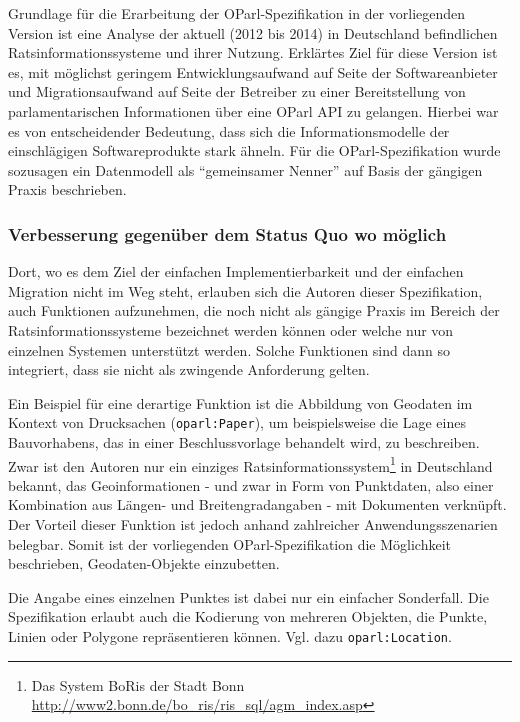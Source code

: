 \documentclass[,a4paper]{article}
\begin{document}
Grundlage für die Erarbeitung der OParl-Spezifikation in der
vorliegenden Version ist eine Analyse der aktuell (2012 bis 2014) in
Deutschland befindlichen Ratsinformationssysteme und ihrer Nutzung.
Erklärtes Ziel für diese Version ist es, mit möglichst geringem
Entwicklungsaufwand auf Seite der Softwareanbieter und Migrationsaufwand
auf Seite der Betreiber zu einer Bereitstellung von parlamentarischen
Informationen über eine OParl API zu gelangen. Hierbei war es von
entscheidender Bedeutung, dass sich die Informationsmodelle der
einschlägigen Softwareprodukte stark ähneln. Für die OParl-Spezifikation
wurde sozusagen ein Datenmodell als ``gemeinsamer Nenner'' auf Basis der
gängigen Praxis beschrieben.

\subsubsection{Verbesserung gegenüber dem Status Quo wo
möglich}\label{verbesserung-gegenuxfcber-dem-status-quo-wo-muxf6glich}

Dort, wo es dem Ziel der einfachen Implementierbarkeit und der einfachen
Migration nicht im Weg steht, erlauben sich die Autoren dieser
Spezifikation, auch Funktionen aufzunehmen, die noch nicht als gängige
Praxis im Bereich der Ratsinformationssysteme bezeichnet werden können
oder welche nur von einzelnen Systemen unterstützt werden. Solche
Funktionen sind dann so integriert, dass sie nicht als zwingende
Anforderung gelten.

Ein Beispiel für eine derartige Funktion ist die Abbildung von Geodaten
im Kontext von Drucksachen (\texttt{oparl:Paper}), um beispielsweise die
Lage eines Bauvorhabens, das in einer Beschlussvorlage behandelt wird,
zu beschreiben. Zwar ist den Autoren nur ein einziges
Ratsinformationssystem\footnote{Das System BoRis der Stadt Bonn
  \url{http://www2.bonn.de/bo_ris/ris_sql/agm_index.asp}} in Deutschland
bekannt, das Geoinformationen - und zwar in Form von Punktdaten, also
einer Kombination aus Längen- und Breitengradangaben - mit Dokumenten
verknüpft. Der Vorteil dieser Funktion ist jedoch anhand zahlreicher
Anwendungsszenarien belegbar. Somit ist der vorliegenden
OParl-Spezifikation die Möglichkeit beschrieben, Geodaten-Objekte
einzubetten.

Die Angabe eines einzelnen Punktes ist dabei nur ein einfacher
Sonderfall. Die Spezifikation erlaubt auch die Kodierung von mehreren
Objekten, die Punkte, Linien oder Polygone repräsentieren können. Vgl.
dazu \texttt{oparl:Location}.
\end{document}
